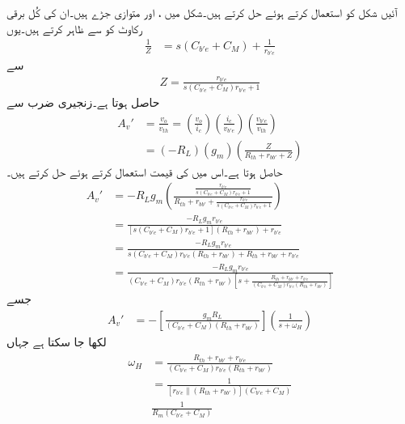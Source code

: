 آئیں شکل  کو  استعمال کرتے ہوئے حل کرتے ہیں۔شکل میں ،  اور  متوازی جڑے ہیں۔ان کی کُل برقی رکاوٹ کو  سے ظاہر کرتے ہیں۔یوں
\begin{align*}
\frac{1}{Z}&=s\left(C_{b'e}+C_M \right)+\frac{1}{r_{b'e}}
\end{align*}
سے
\begin{align}
Z=\frac{r_{b'e}}{s \left(C_{b'e}+C_M \right) r_{b'e}+1}
\end{align}
حاصل ہوتا ہے۔زنجیری ضرب سے
\begin{align*}
A_v'&=\frac{v_o}{v_{th}}=\left(\frac{v_o}{i_c}\right) \left(\frac{i_c}{v_{b'e}}\right) \left(\frac{v_{b'e}}{v_{th}}\right)\\
&=\left(-R_L \right) \left(g_m \right) \left(\frac{Z}{R_{th}+r_{bb'}+Z} \right)
\end{align*}
حاصل ہوتا ہے۔اس میں  کی قیمت استعمال کرتے ہوئے حل کرتے ہیں۔
\begin{align*}
A_v'&=-R_L g_m \left(\frac{\frac{r_{b'e}}{s \left(C_{b'e}+C_M \right) r_{b'e}+1}}{R_{th}+r_{bb'}+\frac{r_{b'e}}{s \left(C_{b'e}+C_M \right) r_{b'e}+1}} \right)\\
&=\frac{-R_L g_m r_{b'e}}{\left[s \left(C_{b'e}+C_M \right) r_{b'e}+1 \right] \left(R_{th}+r_{bb'} \right) +r_{b'e}}\\
&=\frac{-R_L g_m r_{b'e}}{s \left(C_{b'e}+C_M \right) r_{b'e} \left(R_{th}+r_{bb'} \right) +R_{th}+r_{bb'}+r_{b'e}}\\
&=\frac{-R_L g_m r_{b'e}}{\left(C_{b'e}+C_M \right) r_{b'e} \left(R_{th}+r_{bb'} \right) \left[s+\frac{R_{th}+r_{bb'}+r_{b'e}}{\left(C_{b'e}+C_M \right) r_{b'e} \left(R_{th}+r_{bb'} \right)} \right]}
\end{align*}
جسے
\begin{align}  \label{مساوات_تعددی_ردعمل_بلند_تعددی_تھونن}
A_v'&=-\left[\frac{g_m R_L}{\left(C_{b'e}+C_M \right) \left(R_{th}+r_{bb'} \right)}\right] \left(\frac{1}{s+\omega_H} \right)
\end{align}
لکھا جا سکتا ہے جہاں
\begin{gather}
\begin{aligned}\label{مساوات_تعددی_ردعمل_بلند_انقطاعی_تعدد_ٹھیک_ٹھیک}
\omega_H&=\frac{R_{th}+r_{bb'}+r_{b'e}}{\left(C_{b'e}+C_M \right) r_{b'e} \left(R_{th}+r_{bb'} \right)}\\
&=\frac{1}{\left[r_{b'e} \mathbin{\|} \left(R_{th}+r_{bb'} \right) \right] \left(C_{b'e}+C_M \right)}\\
&\frac{1}{R_m \left(C_{b'e}+C_{M} \right)}
\end{aligned}
\end{gather}
